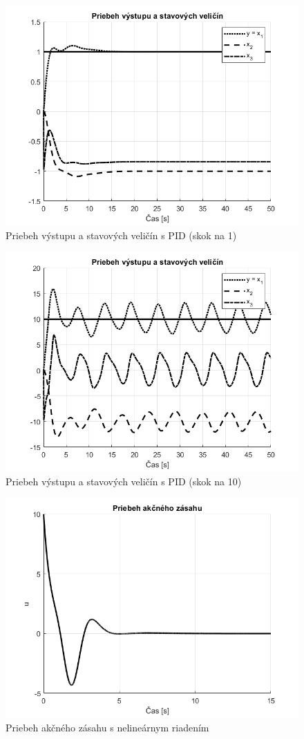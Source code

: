 \documentclass[../main.tex]{subfiles}
\begin{document}
	\begin{figure}[h!]
		\centering
		\includegraphics[width=0.8\linewidth]{SimulaciaPID}
		\caption{Priebeh výstupu a stavových veličín s PID (skok na 1)}
		\label{fig:svlvs2_SimulaciaPID}
	\end{figure}

	\begin{figure}[h!]
		\centering
		\includegraphics[width=0.8\linewidth]{SimulaciaPIDVelkySkok}
		\caption{Priebeh výstupu a stavových veličín s PID (skok na 10)}
		\label{fig:svlvs2_SimulaciaPIDVelkySkok}
	\end{figure}

	\begin{figure}[h!]
		\centering
		\includegraphics[width=0.8\linewidth]{SimulaciaNelinU}
		\caption{Priebeh akčného zásahu s nelineárnym riadením}
		\label{fig:svlvs2_simulaciaNelinU}
	\end{figure}
\end{document}
